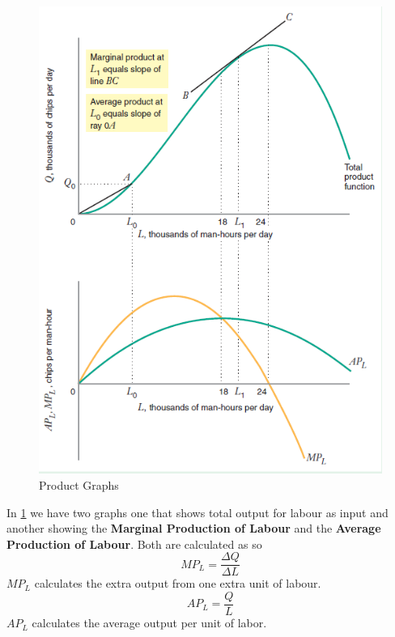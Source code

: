 \documentclass[../ECON-281-Notes.tex]{subfiles}
\begin{document}
\begin{figure}[!ht]
    \centering
    \includegraphics[width=\columnwidth]{../assets/Production_graphs.png}
    \caption{Product Graphs}
    \label{fig:product_graphs}
\end{figure}

In \cref{fig:product_graphs} we have two graphs one that shows total output for labour as input and another showing the \textbf{Marginal Production of Labour} and the \textbf{Average Production of Labour}. 
Both are calculated as so
\begin{equation}
    MP_L = \frac{\Delta Q}{\Delta L}    
\end{equation}
\(MP_L\) calculates the extra output from one extra unit of labour.
\begin{equation}
    AP_L = \frac{Q}{L}  
\end{equation}
\(AP_L\) calculates the average output per unit of labor.
\end{document}
